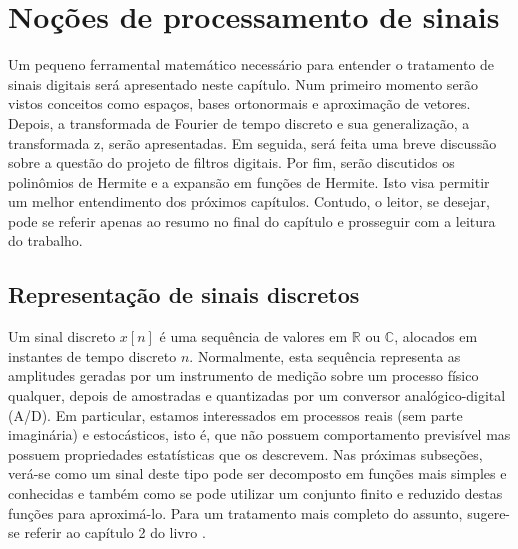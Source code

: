 
\chapter[Noções de processamento de sinais]{Noções de processamento de sinais}
\thispagestyle{empty}
\label{chap:chapter3}

Um pequeno ferramental matemático necessário para entender o tratamento de sinais digitais será apresentado neste capítulo. Num primeiro momento serão vistos conceitos como espaços, bases ortonormais e aproximação de vetores. Depois, a transformada de Fourier de tempo discreto e sua generalização, a transformada z, serão apresentadas. Em seguida, será feita uma breve discussão sobre a questão do projeto de filtros digitais. Por fim, serão discutidos os polinômios de Hermite e a expansão em funções de Hermite. Isto visa permitir um melhor entendimento dos próximos capítulos. Contudo, o leitor, se desejar, pode se referir apenas ao resumo no final do capítulo e prosseguir com a leitura do trabalho.


\section{Representação de sinais discretos}
\label{sec:discretesig}
Um sinal discreto $x[n]$ é uma sequência de valores em $\mathbb{R}$ ou $\mathbb{C}$, alocados em instantes de tempo discreto $n$. Normalmente, esta sequência representa as amplitudes geradas por um instrumento de medição sobre um processo físico qualquer, depois de amostradas e quantizadas por um conversor analógico-digital (A/D). Em particular, estamos interessados em processos reais (sem parte imaginária) e estocásticos, isto é, que não possuem comportamento previsível mas possuem propriedades estatísticas que os descrevem. Nas próximas subseções, verá-se como um sinal deste tipo pode ser decomposto em funções mais simples e conhecidas e também como se pode utilizar um conjunto finito e reduzido destas funções para aproximá-lo. Para um tratamento mais completo do assunto, sugere-se referir ao capítulo 2 do livro \cite{Vetterli1995}.

